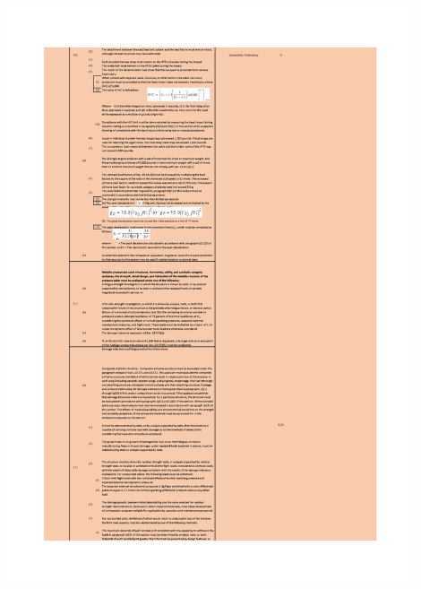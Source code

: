 \begin{table}[H]
\centering
\includegraphics[width=0.9\textwidth]{bilder/Tabellen/MPP_Konstruktion_10.pdf}
\end{table}


